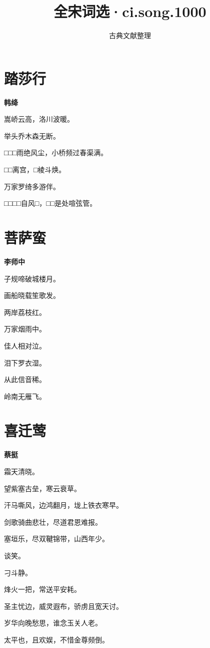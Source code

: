 \documentclass[12pt,a4paper]{ctexbook}
\title{全宋词选·ci.song.1000}
\author{古典文献整理}
\date{}
\begin{document}
\maketitle
\tableofcontents
\newpage
\section{踏莎行}
\textbf{韩绛}\par\vspace{0.5em}
嵩峤云高，洛川波暖。\par
举头乔木森无断。\par
□□□雨绝风尘，小桥频过春渠满。\par
□□离宫，□棱斗焕。\par
万家罗绮多游伴。\par
□□□□自风□，□□是处喧弦管。\par

\section{菩萨蛮}
\textbf{李师中}\par\vspace{0.5em}
子规啼破城楼月。\par
画船晓载笙歌发。\par
两岸荔枝红。\par
万家烟雨中。\par
佳人相对泣。\par
泪下罗衣湿。\par
从此信音稀。\par
岭南无雁飞。\par

\section{喜迁莺}
\textbf{蔡挺}\par\vspace{0.5em}
霜天清晓。\par
望紫塞古垒，寒云衰草。\par
汗马嘶风，边鸿翻月，垅上铁衣寒早。\par
剑歌骑曲悲壮，尽道君恩难报。\par
塞垣乐，尽双鞬锦带，山西年少。\par
谈笑。\par
刁斗静。\par
烽火一把，常送平安耗。\par
圣主忧边，威灵遐布，骄虏且宽天讨。\par
岁华向晚愁思，谁念玉关人老。\par
太平也，且欢娱，不惜金尊频倒。\par
\end{document}
